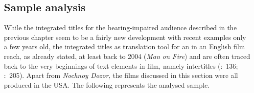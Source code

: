 \subsection{Sample analysis}\label{sec:4.2.1}

While the integrated titles for the hearing-impaired audience described in the previous chapter seem to be a fairly new development with recent examples only a few years old, the integrated titles as translation tool for an  in an English film reach, as already stated, at least back to 2004 (\textit{Man on Fire}) and are often traced back to the very beginnings of text elements in film, namely intertitles (\citealt{mcclarty2012}:~136; \citealt{romero-fresco2013}:~205). Apart from \textit{Nochnoy Dozor}, the films discussed in this section were all produced in the USA. The following  represents the analysed sample.

